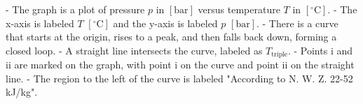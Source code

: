 - The graph is a plot of pressure \( p \) in \([ \text{bar} ]\) versus temperature \( T \) in \([ ^\circ \text{C} ]\).
- The x-axis is labeled \( T \) \([ ^\circ \text{C} ]\) and the y-axis is labeled \( p \) \([ \text{bar} ]\).
- There is a curve that starts at the origin, rises to a peak, and then falls back down, forming a closed loop.
- A straight line intersects the curve, labeled as \( T_{\text{triple}} \).
- Points i and ii are marked on the graph, with point i on the curve and point ii on the straight line.
- The region to the left of the curve is labeled "According to N. W. Z. 22-52 kJ/kg".